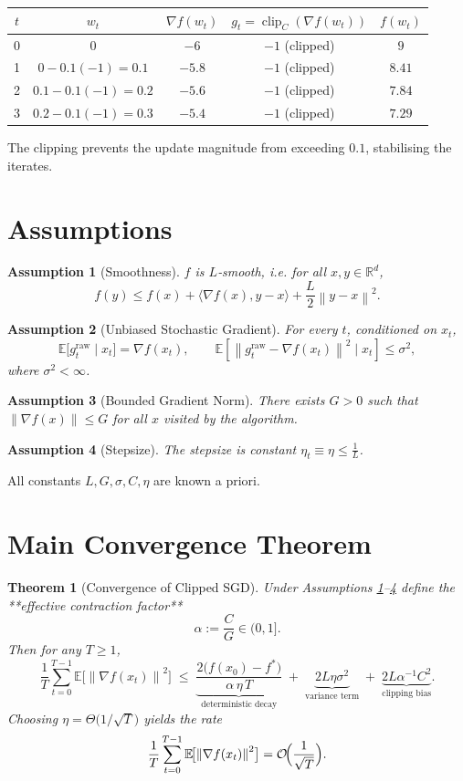 \documentclass{article}
\newtheorem{theorem}{Theorem}
\newtheorem{assumption}{Assumption}
\newcommand{\EE}{\mathbb{E}}
\newcommand{\norm}[1]{\left\lVert#1\right\rVert}
\newcommand{\clip}{\operatorname{clip}}
\begin{document}
\begin{center}
\begin{tabular}{c|c|c|c|c}
$t$ & $w_{t}$ & $\nabla f(w_{t})$ & $g_{t}=\clip_{C}(\nabla f(w_{t}))$ & $f(w_{t})$\\ \hline
0 & $0$ & $-6$ & $-1$ (clipped) & $9$\\
1 & $0-0.1(-1)=0.1$ & $-5.8$ & $-1$ (clipped) & $8.41$\\
2 & $0.1-0.1(-1)=0.2$ & $-5.6$ & $-1$ (clipped) & $7.84$\\
3 & $0.2-0.1(-1)=0.3$ & $-5.4$ & $-1$ (clipped) & $7.29$
\end{tabular}
\end{center}
The clipping prevents the update magnitude from exceeding $0.1$, stabilising the iterates.

\newpage
\section*{Assumptions}
\begin{assumption}[Smoothness]\label{ass:smooth}
$f$ is $L$‑smooth, i.e. for all $x,y\in\mathbb{R}^{d}$,
\[
f(y)\le f(x)+\langle\nabla f(x),y-x\rangle+\frac{L}{2}\norm{y-x}^{2}.
\]
\end{assumption}
\begin{assumption}[Unbiased Stochastic Gradient]\label{ass:unbiased}
For every $t$, conditioned on $x_{t}$,
\[
\EE\bigl[g^{\text{raw}}_{t}\mid x_{t}\bigr]=\nabla f(x_{t}),\qquad
\EE\!\left[\norm{g^{\text{raw}}_{t}-\nabla f(x_{t})}^{2}\mid x_{t}\right]\le\sigma^{2},
\]
where $\sigma^{2}<\infty$.
\end{assumption}
\begin{assumption}[Bounded Gradient Norm]\label{ass:bounded}
There exists $G>0$ such that $\norm{\nabla f(x)}\le G$ for all $x$ visited by the algorithm.
\end{assumption}
\begin{assumption}[Stepsize]\label{ass:stepsize}
The stepsize is constant $\eta_{t}\equiv\eta\le\frac{1}{L}$.
\end{assumption}
All constants $L,G,\sigma,C,\eta$ are known a priori.

\section*{Main Convergence Theorem}
\begin{theorem}[Convergence of Clipped SGD]\label{thm:convergence}
Under Assumptions \ref{ass:smooth}–\ref{ass:stepsize} define the **effective contraction factor**
\[
\alpha:=\frac{C}{G}\in(0,1].
\]
Then for any $T\ge1$,
\[
\frac{1}{T}\sum_{t=0}^{T-1}\EE\!\bigl[\norm{\nabla f(x_{t})}^{2}\bigr]
\;\le\;
\underbrace{\frac{2\bigl(f(x_{0})-f^{*}\bigr)}{\alpha\,\eta\,T}}_{\text{deterministic decay}}
\;+\;
\underbrace{2L\eta\sigma^{2}}_{\text{variance term}}
\;+\;
\underbrace{2L\alpha^{-1}C^{2}}_{\text{clipping bias}} .
\]
Choosing $\eta=\Theta\!\bigl(1/\sqrt{T}\bigr)$ yields the rate
\[
\frac{1}{T}\sum_{t=0}^{T-1}\EE\!\bigl[\norm{\nabla f(x_{t})}^{2}\bigr]=\mathcal{O}\!\Bigl(\frac{1}{\sqrt{T}}\Bigr).
\]
\end{theorem}
\end{document}
